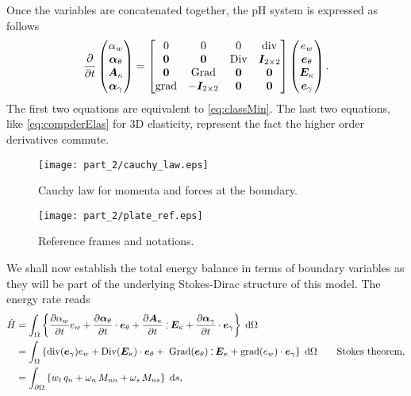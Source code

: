 Once the variables are concatenated together, the pH system is expressed as follows
\begin{equation}
\diffp{}{t}
\begin{pmatrix}
\alpha_w \\
\bm\alpha_\theta \\
\bm{A}_\kappa \\
\bm\alpha_{\gamma} \\
\end{pmatrix} = 
\begin{bmatrix}
0  & 0  & 0  & \div \\
\bm{0} & \bm{0} &  \Div & \bm{I}_{2 \times 2}\\
\bm{0}  & \Grad  & \bm{0}  & \bm{0}\\
\grad & -\bm{I}_{2 \times 2} &  \bm{0} & \bm{0} \\
\end{bmatrix}
\begin{pmatrix}
e_w \\
\bm{e}_{\theta} \\
\bm{E}_{\kappa} \\
\bm{e}_{\gamma} \\
\end{pmatrix}.
\end{equation}
The first two equations are equivalent to \eqref{eq:classMin}. The last two equations, like \eqref{eq:compderElas} for 3D elasticity, represent the fact the higher order derivatives commute.
\begin{figure}[t]
	\centering
	\texttt{[image: part\_2/cauchy\_law.eps]}
	\caption{Cauchy law for momenta and forces at the boundary.}
	\label{fig:Cauchy_law}
\end{figure}
\begin{figure}[tb]
	\centering
	\texttt{[image: part\_2/plate\_ref.eps]}
	\caption{Reference frames and notations.}
	\label{fig:plate_ref}
\end{figure}
We shall now establish the total energy balance in terms of boundary variables as they will  be part of the underlying Stokes-Dirac structure of this model. The energy rate reads
\begin{equation}
\label{eq:enrateMin}
\begin{aligned}
\dot{H}&= \int_{\Omega} \left\{ \diffp{\alpha_w}{t} e_w  + \diffp{\bm\alpha_\theta}{t} \cdot \bm{e}_\theta + \diffp{\bm{A}_{\kappa}}{t} \cddot \bm{E}_{\kappa}  + \diffp{\bm\alpha_{\gamma}}{t} \cdot \bm{e}_{\gamma} \right\} \d\Omega\\
&= \int_{\Omega} \left\{ \div(\bm{e}_{\gamma}) e_w  + \Div(\bm{E}_{\kappa}) \cdot \bm{e}_\theta + \; \Grad(\bm{e}_{\theta}) \cddot \bm{E}_{\kappa}  + \grad (e_w) \cdot \bm{e}_{\gamma} \right\} \d\Omega \qquad \text{Stokes theorem,} \\
&= \int_{\partial \Omega} \left\{ w_t \, q_n  + \omega_n \, M_{nn} + \omega_s \, M_{ns} \right\} \d{s},  \\
\end{aligned}
\end{equation}
